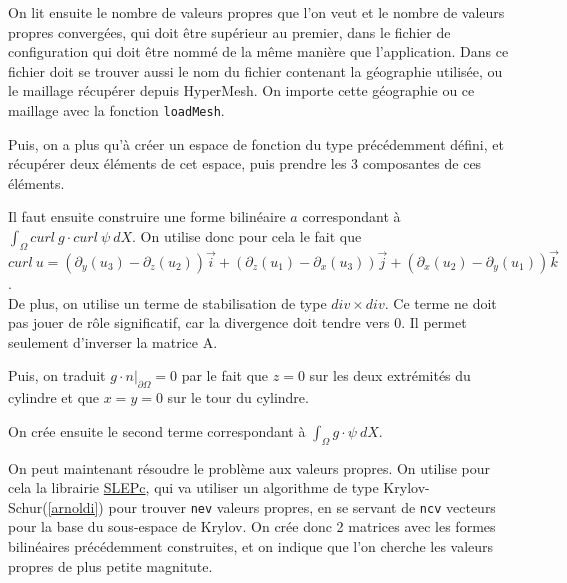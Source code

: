 

On lit ensuite le nombre de valeurs propres que l'on veut et le nombre de valeurs propres convergées, qui doit être supérieur au premier, dans le fichier de configuration qui doit être nommé de la même manière que l'application. Dans ce fichier doit se trouver aussi le nom du fichier contenant la géographie utilisée, ou le maillage récupérer depuis HyperMesh. On importe cette géographie ou ce maillage avec la fonction \texttt{loadMesh}.



Puis, on a plus qu'à créer un espace de fonction du type précédemment défini, et récupérer deux éléments de cet espace, puis prendre les 3 composantes de ces éléments.



Il faut ensuite construire une forme bilinéaire $a$ correspondant à $\int_\Omega curl\ g\cdot curl\ \psi\ dX$. On utilise donc pour cela le fait que $curl\ u = (\partial_y(u_3)-\partial_z(u_2))\vec{i} + (\partial_z(u_1) - \partial_x(u_3))\vec{j} + (\partial_x(u_2)-\partial_y(u_1))\vec{k}$.\\
De plus, on utilise un terme de stabilisation de type $div \times div$. Ce terme ne doit pas jouer de rôle significatif, car la divergence doit tendre vers 0. Il permet seulement d'inverser la matrice A.



Puis, on traduit $g\cdot n\big\rvert_{\partial\Omega}=0$ par le fait que $z=0$ sur les deux extrémités du cylindre et que $x=y=0$ sur le tour du cylindre.



On crée ensuite le second terme correspondant à $\int_\Omega g\cdot\psi\ dX$.



On peut maintenant résoudre le problème aux valeurs propres. On utilise pour cela la librairie \href{http://www.grycap.upv.es/slepc/}{SLEPc}, qui va utiliser un algorithme de type Krylov-Schur(\ref{arnoldi}) pour trouver \texttt{nev} valeurs propres, en se servant de \texttt{ncv} vecteurs pour la base du sous-espace de Krylov. On crée donc 2 matrices avec les formes bilinéaires précédemment construites, et on indique que l'on cherche les valeurs propres de plus petite magnitute.

